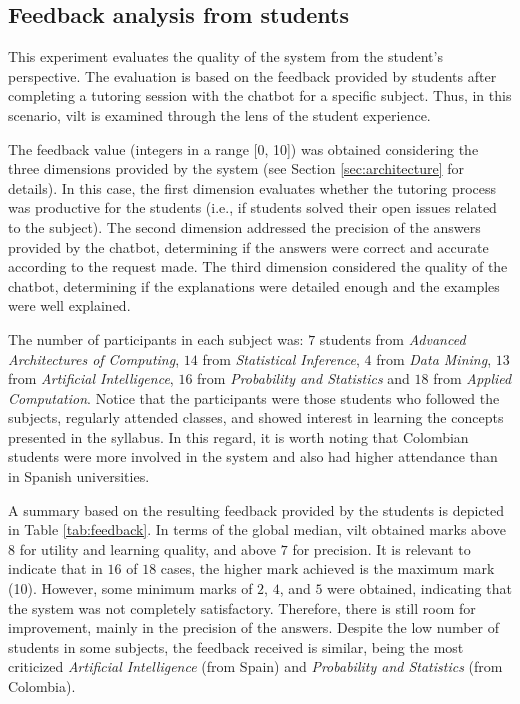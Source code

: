 \documentclass[pdflatex,sn-mathphys-num]{sn-jnl}%
\begin{document}
\subsection{Feedback analysis from students}
\label{sec:feedback}
This experiment evaluates the quality of the system from the student's perspective. The evaluation is based on the feedback provided by students after completing a tutoring session with the chatbot for a specific subject. Thus, in this scenario, \ac{vilt} is examined through the lens of the student experience.

The feedback value (integers in a range [0, 10]) was obtained considering the three dimensions provided by the system (see Section \ref{sec:architecture} for details). In this case, the first dimension evaluates whether the tutoring process was productive for the students (i.e., if students solved their open issues related to the subject). The second dimension addressed the precision of the answers provided by the chatbot, determining if the answers were correct and accurate according to the request made. The third dimension considered the quality of the chatbot, determining if the explanations were detailed enough and the examples were well explained.

The number of participants in each subject was: $7$ students from \emph{Advanced Architectures of Computing}, $14$ from \emph{Statistical Inference}, $4$ from \emph{Data Mining}, $13$ from \emph{Artificial Intelligence}, $16$ from \emph{Probability and Statistics} and $18$ from \emph{Applied Computation}. Notice that the participants were those students who followed the subjects, regularly attended classes, and showed interest in learning the concepts presented in the syllabus. In this regard, it is worth noting that Colombian students were more involved in the system and also had higher attendance than in Spanish universities.

A summary based on the resulting feedback provided by the students is depicted in Table \ref{tab:feedback}. In terms of the global median, \ac{vilt} obtained marks above $8$ for utility and learning quality, and above $7$ for precision. It is relevant to indicate that in $16$ of $18$ cases, the higher mark achieved is the maximum mark (10). However, some minimum marks of $2$, $4$, and $5$ were obtained, indicating that the system was not completely satisfactory. Therefore, there is still room for improvement, mainly in the precision of the answers. Despite the low number of students in some subjects, the feedback received is similar, being the most criticized \emph{Artificial Intelligence} (from Spain) and \emph{Probability and Statistics} (from Colombia).
\end{document}
